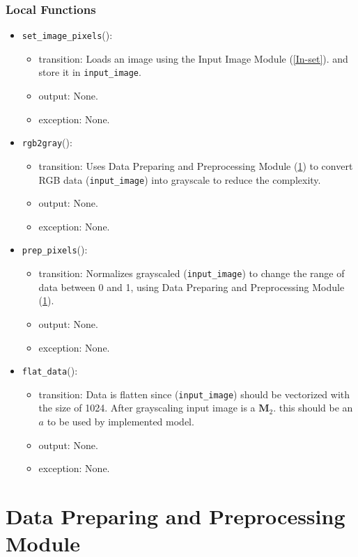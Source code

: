 \documentclass[12pt, titlepage]{article}
\def\code#1{\texttt{#1}}
\begin{document}
\subsubsection{Local Functions}
\begin{itemize}
  \item \code{set\_image\_pixels}():
  \begin{itemize}
    \item transition: Loads an image using the Input Image Module (\ref{In-set}).
    and store it in \code{input\_image}.
    \item output: None.
    \item exception: None.
  \end{itemize}

  \item \code{rgb2gray}():
  \begin{itemize}
    \item transition: Uses Data Preparing and Preprocessing Module (\ref{Data}) to convert 
    RGB data (\code{input\_image}) into grayscale to reduce the complexity. 
    \item output: None.
    \item exception: None.
  \end{itemize}
  \item \code{prep\_pixels}():
  \begin{itemize}
    \item transition: Normalizes grayscaled (\code{input\_image}) to change the range of data between 0 and 1, 
    using Data Preparing and Preprocessing Module (\ref{Data}).
    \item output: None.
    \item exception: None.
  \end{itemize}
  \item \code{flat\_data}():
  \begin{itemize}
    \item transition: Data is flatten since (\code{input\_image}) should be vectorized 
    with the size of 1024. 
    After grayscaling input image is a $\mathbf{M}_{2}$. this should be an ${a}$ to be used by implemented model.
    \item output: None.
    \item exception: None.
  \end{itemize}

\end{itemize}

\newpage

\section{Data Preparing and Preprocessing Module} \label{Data} 
\end{document}
